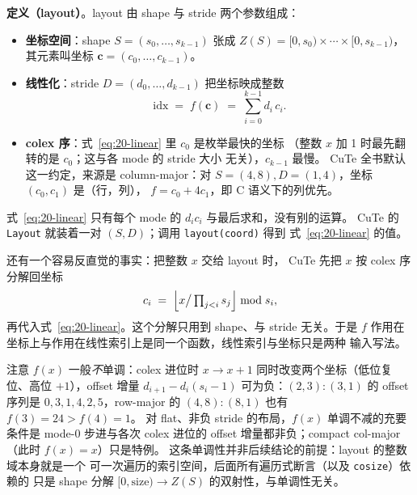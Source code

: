 \textbf{定义（layout）}。layout 由 shape 与 stride 两个参数组成：

\begin{itemize}
  \item \textbf{坐标空间}：shape $S=(s_0,\dots,s_{k-1})$ 张成
        $Z(S) = [0,s_0)\times\cdots\times[0,s_{k-1})$，其元素叫坐标
        $\mathbf{c}=(c_0,\dots,c_{k-1})$。
  \item \textbf{线性化}：stride $D=(d_0,\dots,d_{k-1})$ 把坐标映成整数
        \begin{equation}
          \mathrm{idx} \;=\; f(\mathbf{c}) \;=\; \sum_{i=0}^{k-1} d_i\,c_i .
          \label{eq:20-linear}
        \end{equation}
  \item \textbf{colex 序}：式~\eqref{eq:20-linear} 里 $c_0$ 是枚举最快的坐标
        （整数 $x$ 加 1 时最先翻转的是 $c_0$；这与各 mode 的 stride 大小
        无关），$c_{k-1}$ 最慢。
        CuTe 全书默认这一约定，来源是 column-major：对
        $S=(4,8),D=(1,4)$，坐标 $(c_0,c_1)$ 是（行，列），
        $f=c_0+4c_1$，即 C 语义下的列优先。
\end{itemize}

式~\eqref{eq:20-linear} 只有每个 mode 的 $d_i c_i$ 与最后求和，没有别的运算。
CuTe 的 \texttt{Layout} 就装着一对 $(S,D)$；调用 \texttt{layout\allowbreak{}(coord)} 得到
式~\eqref{eq:20-linear} 的值。

还有一个容易反直觉的事实：把整数 $x$ 交给 layout 时，
CuTe 先把 $x$ 按 colex 序分解回坐标
\begin{equation}
  c_i \;=\; \Bigl\lfloor x \big/ \textstyle\prod_{j<i} s_j \Bigr\rfloor
  \bmod s_i ,
  \label{eq:20-colex-decomp}
\end{equation}
再代入式~\eqref{eq:20-linear}。这个分解只用到 shape、与 stride 无关。于是
$f$ 作用在坐标上与作用在线性索引上是同一个函数，线性索引与坐标只是两种
输入写法。

注意 $f(x)$ 一般\emph{不}单调：colex 进位时
$x\to x+1$ 同时改变两个坐标（低位复位、高位 $+1$），offset 增量
$d_{i+1}-d_i(s_i-1)$ 可为负：$(2,3){:}(3,1)$ 的 offset 序列是
$0,3,1,4,2,5$，row-major 的 $(4,8){:}(8,1)$ 也有 $f(3)=24>f(4)=1$。
对 flat、非负 stride 的布局，$f(x)$ 单调不减的充要条件是 mode-0 步进与各次
colex 进位的 offset 增量都非负；compact col-major（此时 $f(x)=x$）只是特例。
这条单调性并非后续结论的前提：layout 的整数域本身就是一个
可一次遍历的索引空间，后面所有遍历式断言（以及 \texttt{cosize}）依赖的
只是 shape 分解 $[0,\mathrm{size})\to Z(S)$ 的双射性，与单调性无关。

